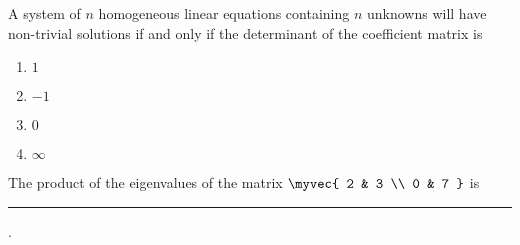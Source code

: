     \item A system of $n$ homogeneous linear equations containing $n$ unknowns will have non-trivial solutions if and only if the determinant of the coefficient matrix is
 \hfill{}
\begin{multicols}{4}
    \begin{enumerate}
        \item $1$
        \item $-1$
        \item $0$
        \item $\infty$
    \end{enumerate}
\end{multicols}
    \item 
        The product of the eigenvalues of the matrix  $\myvec{
            2 & 3 \\
            0 & 7
        }$ is \rule{2cm}{0.1mm}.
  \hfill{}    
